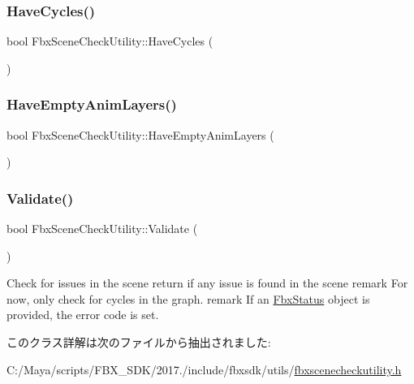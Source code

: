 \subsubsection{\texorpdfstring{Have\+Cycles()}{HaveCycles()}}
{\footnotesize\ttfamily bool Fbx\+Scene\+Check\+Utility\+::\+Have\+Cycles (\begin{DoxyParamCaption}{ }\end{DoxyParamCaption})\hspace{0.3cm}{\ttfamily [protected]}}

\mbox{\label{class_fbx_scene_check_utility_aca14381c6153cbfe485198f7f5e378ab}} 
\subsubsection{\texorpdfstring{Have\+Empty\+Anim\+Layers()}{HaveEmptyAnimLayers()}}
{\footnotesize\ttfamily bool Fbx\+Scene\+Check\+Utility\+::\+Have\+Empty\+Anim\+Layers (\begin{DoxyParamCaption}{ }\end{DoxyParamCaption})\hspace{0.3cm}{\ttfamily [protected]}}

\mbox{\label{class_fbx_scene_check_utility_a1ab351d6f370393663719a46ee4b6eff}} 
\subsubsection{\texorpdfstring{Validate()}{Validate()}}
{\footnotesize\ttfamily bool Fbx\+Scene\+Check\+Utility\+::\+Validate (\begin{DoxyParamCaption}{ }\end{DoxyParamCaption})}

Check for issues in the scene return  if any issue is found in the scene remark For now, only check for cycles in the graph. remark If an \hyperlink{class_fbx_status}{Fbx\+Status} object is provided, the error code is set. 

このクラス詳解は次のファイルから抽出されました\+:\begin{DoxyCompactItemize}
\item 
C\+:/\+Maya/scripts/\+F\+B\+X\+\_\+\+S\+D\+K/2017./include/fbxsdk/utils/\hyperlink{fbxscenecheckutility_8h}{fbxscenecheckutility.\+h}\end{DoxyCompactItemize}
